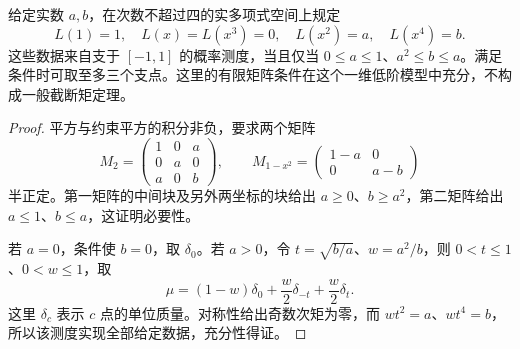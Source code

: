 \begin{example}\label{b3:exm:G-truncated-moment-model}
	给定实数 \(a,b\)，在次数不超过四的实多项式空间上规定
	\[
		L(1)=1,\quad L(x)=L(x^3)=0,\quad L(x^2)=a,\quad L(x^4)=b.
	\]
	这些数据来自支于 \([-1,1]\) 的概率测度，当且仅当 \(0\le a\le1\)、\(a^2\le b\le a\)。满足条件时可取至多三个支点。这里的有限矩阵条件在这个一维低阶模型中充分，不构成一般截断矩定理。
\end{example}
\begin{proof}
	平方与约束平方的积分非负，要求两个矩阵
	\[
		M_2=\begin{pmatrix}1&0&a\\0&a&0\\a&0&b\end{pmatrix},\qquad
		M_{1-x^2}=\begin{pmatrix}1-a&0\\0&a-b\end{pmatrix}
	\]
	半正定。第一矩阵的中间块及另外两坐标的块给出 \(a\ge0\)、\(b\ge a^2\)，第二矩阵给出 \(a\le1\)、\(b\le a\)，这证明必要性。

	若 \(a=0\)，条件使 \(b=0\)，取 \(\delta_0\)。若 \(a>0\)，令 \(t=\sqrt{b/a}\)、\(w=a^2/b\)，则 \(0<t\le1\)、\(0<w\le1\)，取
	\[
		\mu=(1-w)\delta_0+\dfrac w2\delta_{-t}+\dfrac w2\delta_t.
	\]
	这里 \(\delta_c\) 表示 \(c\) 点的单位质量。对称性给出奇数次矩为零，而 \(wt^2=a\)、\(wt^4=b\)，所以该测度实现全部给定数据，充分性得证。
\end{proof}
